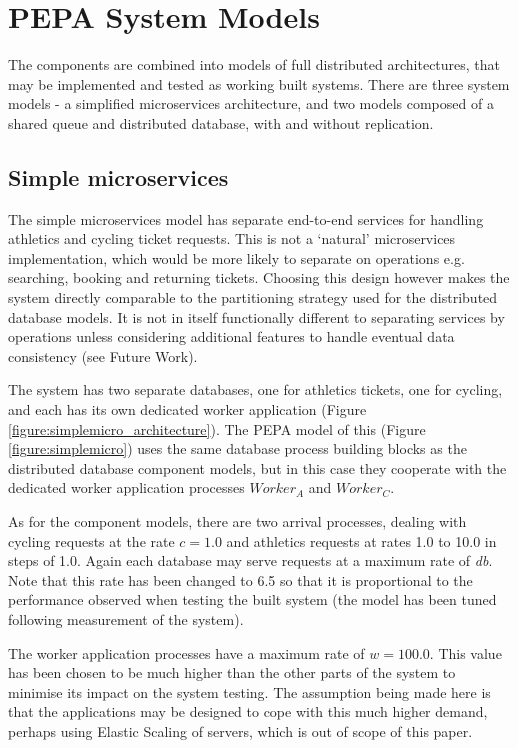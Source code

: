 %
%

\section{PEPA System Models}\label{sec:pepa-system-models}

The components are combined into models of full distributed architectures, that may be implemented and tested as working built systems.  There are three system models - a simplified microservices architecture, and two models composed of a shared queue and distributed database, with and without replication.

%
%
\FloatBarrier
\subsection{Simple microservices}

The simple microservices model has separate end-to-end services for handling athletics and cycling ticket requests.  This is not a `natural' microservices implementation, which would be more likely to separate on operations e.g. searching, booking and returning tickets.  Choosing this design however makes the system directly comparable to the partitioning strategy used for the distributed database models.  It is not in itself functionally different to separating services by operations unless considering additional features to handle eventual data consistency (see Future Work).

The system has two separate databases, one for athletics tickets, one for cycling, and each has its own dedicated worker application (Figure \ref{figure:simplemicro_architecture}).  The PEPA model of this (Figure \ref{figure:simplemicro}) uses the same database process building blocks as the distributed database component models, but in this case they cooperate with the dedicated worker application processes $\mathit{Worker_A}$ and $\mathit{Worker_C}$.

As for the component models, there are two arrival processes, dealing with cycling requests at the rate $\mathit{c=1.0}$ and athletics requests at rates 1.0 to 10.0 in steps of 1.0.  Again each database may serve requests at a maximum rate of {\itshape db}.  Note that this rate has been changed to 6.5 so that it is proportional to the performance observed when testing the built system (the model has been tuned following measurement of the system).

The worker application processes have a maximum rate of $\mathit{w=100.0}$.  This value has been chosen to be much higher than the other parts of the system to minimise its impact on the system testing.  The assumption being made here is that the applications may be designed to cope with this much higher demand, perhaps using Elastic Scaling of servers, which is out of scope of this paper.

